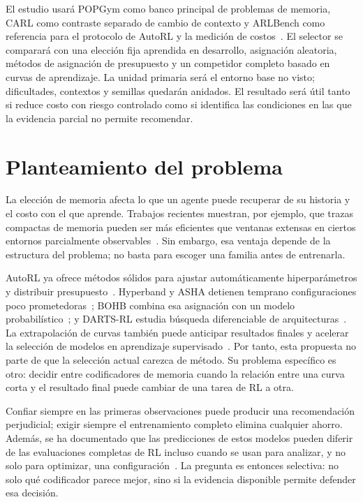 \documentclass[11pt,letterpaper]{article}
\begin{document}
El estudio usará POPGym como banco principal de problemas de memoria, CARL como contraste separado de cambio de contexto y ARLBench como referencia para el protocolo de AutoRL y la medición de costos~\cite{morad2023popgym,benjamins2023carl,becktepe2026arlbench}.
El selector se comparará con una elección fija aprendida en desarrollo, asignación aleatoria, métodos de asignación de presupuesto y un competidor completo basado en curvas de aprendizaje.
La unidad primaria será el entorno base no visto; dificultades, contextos y semillas quedarán anidados.
El resultado será útil tanto si reduce costo con riesgo controlado como si identifica las condiciones en las que la evidencia parcial no permite recomendar.

\section{Planteamiento del problema}

La elección de memoria afecta lo que un agente puede recuperar de su historia y el costo con el que aprende.
Trabajos recientes muestran, por ejemplo, que trazas compactas de memoria pueden ser más eficientes que ventanas extensas en ciertos entornos parcialmente observables~\cite{eberhard2025memorytraces}.
Sin embargo, esa ventaja depende de la estructura del problema; no basta para escoger una familia antes de entrenarla.

AutoRL ya ofrece métodos sólidos para ajustar automáticamente hiperparámetros y distribuir presupuesto~\cite{eimer2023hpo,becktepe2026arlbench}.
Hyperband y ASHA detienen temprano configuraciones poco prometedoras~\cite{li2018hyperband,li2020asha}; BOHB combina esa asignación con un modelo probabilístico~\cite{falkner2018bohb}; y DARTS-RL estudia búsqueda diferenciable de arquitecturas~\cite{miao2022dartsrl}.
La extrapolación de curvas también puede anticipar resultados finales y acelerar la selección de modelos en aprendizaje supervisado~\cite{adriaensen2023lcpfn}.
Por tanto, esta propuesta no parte de que la selección actual carezca de método.
Su problema específico es otro: decidir entre codificadores de memoria cuando la relación entre una curva corta y el resultado final puede cambiar de una tarea de RL a otra.

Confiar siempre en las primeras observaciones puede producir una recomendación perjudicial; exigir siempre el entrenamiento completo elimina cualquier ahorro.
Además, se ha documentado que las predicciones de estos modelos pueden diferir de las evaluaciones completas de RL incluso cuando se usan para analizar, y no solo para optimizar, una configuración~\cite{dierkes2025prediction}.
La pregunta es entonces selectiva: no solo qué codificador parece mejor, sino si la evidencia disponible permite defender esa decisión.
\end{document}
